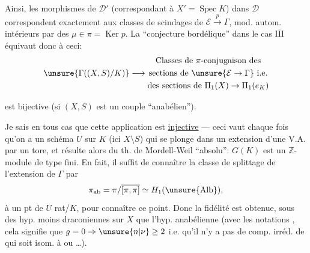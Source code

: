 Ainsi, les morphismes de $\mathcal D'$ (correspondant à $X'=\operatorname{Spec}K$) dans $\mathcal D$ correspondent exactement aux classes de scindages de $\mathcal E\xrightarrow{p}\Gamma$, mod. autom. intérieurs par des $\mu\in\pi=\operatorname{Ker}p$. La ``conjecture bordélique'' dans le cas \uline{$\overline{\mathrm{III}}$} équivaut donc à ceci:
\[
 \unsure{\Gamma((X,S)/K)}\longrightarrow
 \begin{gathered}
 \text{Classes de $\pi$-conjugaison des}\\
 \text{sections de }\unsure{\mathcal E\to\Gamma}\text{ i.e.}\\
 \text{des sections de }\Pi_1(X)\to\Pi_1(e_K)
 \end{gathered}
\]


est bijective (si $(X,S)$ est un couple ``anabélien'').

Je sais en tous cas que cette application est \uline{injective} --- ceci vaut chaque fois qu'on a un schéma $U$ sur $K$ (ici $X\setminus S$) qui se plonge dans un  extension d'une V.A. par un tore, et résulte alors du th. de Mordell-Weil ``absolu'': $G(K)$ est un $\mathbb Z$-module de type fini.
En fait, il suffit de connaître la classe de splittage de l'extension  de $\Gamma$ par
\[
 \pi_{\mathrm{ab}}=\pi/\overline{[\pi,\pi]}\simeq H_1(\unsure{\mathrm{Alb}}),
\]
  à un pt de $U$ rat/$K$, pour connaître ce point. Donc la  fidélité est obtenue, sous des hyp. moins draconiennes sur $X$ que l'hyp. anabélienne (avec les notations  , cela signifie que $g=0\Rightarrow\unsure{n|\nu}\ge2$ i.e. qu'il n'y a pas de comp. irréd. de  qui soit isom. à  ou  \ldots).

